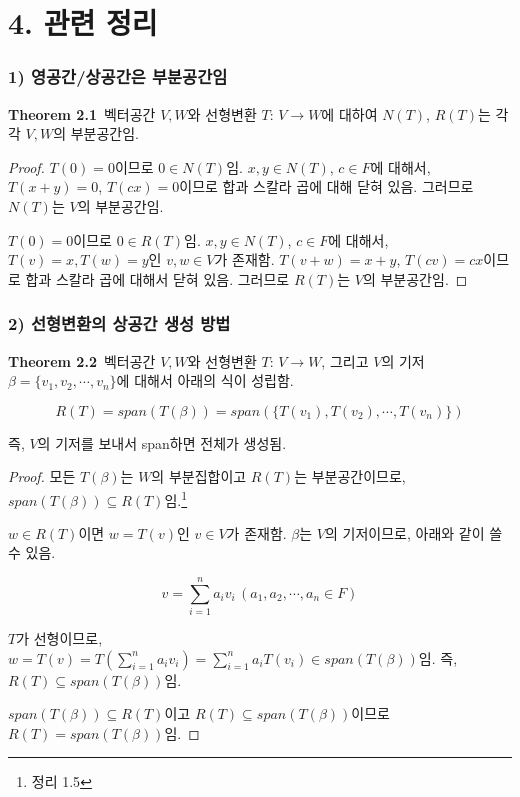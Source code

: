 \documentclass[10pt, a4paper]{article}
\begin{document}
\section*{4. 관련 정리}
\subsubsection*{1) 영공간/상공간은 부분공간임}
\textbf{Theorem 2.1}\, 벡터공간 $V, W$와 선형변환 $T:\,V \rightarrow W$에 대하여 $N(T)$, $R(T)$는 각각 $V, W$의 부분공간임.

\begin{proof}
$T(0)=0$이므로 $0 \in N(T)$임. $x,y \in N(T)$, $c \in F$에 대해서, $T(x+y)=0$, $T(cx)=0$이므로 합과 스칼라 곱에 대해 닫혀 있음. 그러므로 $N(T)$는 $V$의 부분공간임.

$T(0)=0$이므로 $0 \in R(T)$임. $x,y \in N(T)$, $c \in F$에 대해서, $T(v)=x, T(w)=y$인 $v,w \in V$가 존재함. $T(v+w)=x+y$, $T(cv)=cx$이므로 합과 스칼라 곱에 대해서 닫혀 있음. 그러므로 $R(T)$는 $V$의 부분공간임.
\end{proof}

\subsubsection*{2) 선형변환의 상공간 생성 방법}
\textbf{Theorem 2.2}\, 벡터공간 $V, W$와 선형변환 $T:\,V \rightarrow W$, 그리고 $V$의 기저 $\beta = \{v_1,v_2, \cdots ,v_n\}$에 대해서 아래의 식이 성립함.

\[
R(T)=span(T(\beta))=span(\{T(v_1),T(v_2), \cdots ,T(v_n)\})
\]

즉, $V$의 기저를 보내서 span하면 전체가 생성됨.

\begin{proof}
모든 $T(\beta)$는 $W$의 부분집합이고 $R(T)$는 부분공간이므로, $span(T(\beta)) \subseteq R(T)임.$\footnote{정리 1.5}

$w \in R(T)$이면 $w=T(v)$인 $v \in V$가 존재함. $\beta$는 $V$의 기저이므로, 아래와 같이 쓸 수 있음.

\[
v= \sum_{i=1}^{n}{a_i v_i}\,(a_1,a_2, \cdots ,a_n \in F)
\]

$T$가 선형이므로, $w=T(v)=T(\sum_{i=1}^{n}{a_i v_i})=\sum_{i=1}^{n}{a_i T(v_i)} \in span(T(\beta))$임. 즉, $R(T) \subseteq span(T(\beta))$임.

$span(T(\beta)) \subseteq R(T)$이고 $R(T) \subseteq span(T(\beta))$이므로 $R(T) = span(T(\beta))$임.
\end{proof}


\newpage
\end{document}
